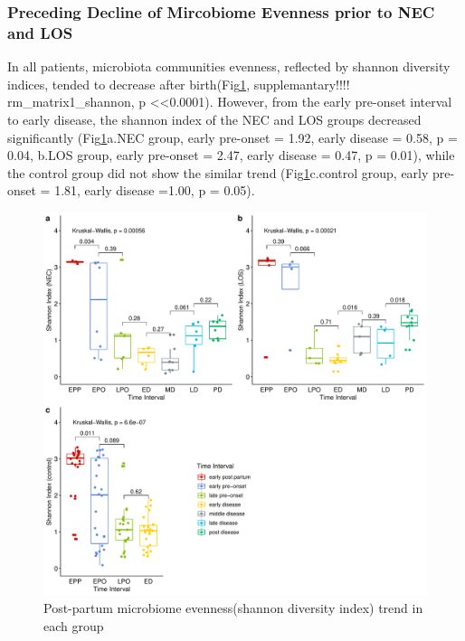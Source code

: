 \documentclass[fleqn,10pt,lineno]{wlpeerj} %
\begin{document}
    \subsubsection*{Preceding Decline of Mircobiome Evenness prior to NEC and LOS}
    In all patients, microbiota communities evenness, reflected by shannon diversity indices, tended to decrease after birth(Fig\ref{fig:shannon-group-time}, supplemantary!!!! rm\_matrix1\_shannon, p \textless <0.0001). However, from the early pre-onset interval to early disease, the shannon index of the NEC and LOS groups decreased significantly (Fig\ref{fig:shannon-group-time}a.NEC group, early pre-onset = 1.92, early disease = 0.58, p = 0.04, b.LOS group, early pre-onset = 2.47, early disease = 0.47, p = 0.01), while the control group did not show the similar trend (Fig\ref{fig:shannon-group-time}c.control group, early pre-onset = 1.81, early disease =1.00, p = 0.05).
    \begin{figure}[ht]\centering
      \includegraphics[width=\linewidth]{figure/shannon-group-time.pdf}
      \caption{Post-partum microbiome evenness(shannon diversity index) trend in each group}
      \label{fig:shannon-group-time}
    \end{figure}
\end{document}
